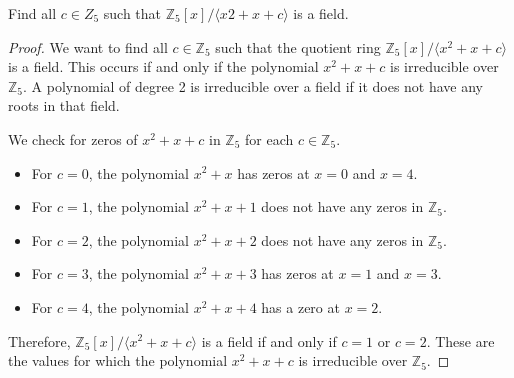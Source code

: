 \documentclass[12pt]{amsart}
\theoremstyle{definition}
\numberwithin{equation}{section}
\theoremstyle{plain}
\newcommand{\Z}{\mathbb{Z}}
\begin{document}
\vspace*{20pt}
\begin{exercise}{8} Find all $c \in Z_5$ such that $\Z_5[x]/\langle x2 + x + c\rangle$ is a field.
\begin{proof}
We want to find all \( c \in \mathbb{Z}_5 \) such that the quotient ring \( \mathbb{Z}_5[x]/\langle x^2 + x + c \rangle \) is a field. This occurs if and only if the polynomial \( x^2 + x + c \) is irreducible over \( \mathbb{Z}_5 \). A polynomial of degree 2 is irreducible over a field if it does not have any roots in that field.

We check for zeros of \( x^2 + x + c \) in \( \mathbb{Z}_5 \) for each \( c \in \mathbb{Z}_5 \). 

\begin{itemize}
    \item For \( c = 0 \), the polynomial \( x^2 + x \) has zeros at \( x = 0 \) and \( x = 4 \).
    \item For \( c = 1 \), the polynomial \( x^2 + x + 1 \) does not have any zeros in \( \mathbb{Z}_5 \).
    \item For \( c = 2 \), the polynomial \( x^2 + x + 2 \) does not have any zeros in \( \mathbb{Z}_5 \).
    \item For \( c = 3 \), the polynomial \( x^2 + x + 3 \) has zeros at \( x = 1 \) and \( x = 3 \).
    \item For \( c = 4 \), the polynomial \( x^2 + x + 4 \) has a zero at \( x = 2 \).
\end{itemize}

Therefore, \( \mathbb{Z}_5[x]/\langle x^2 + x + c \rangle \) is a field if and only if \( c = 1 \) or \( c = 2 \). These are the values for which the polynomial \( x^2 + x + c \) is irreducible over \( \mathbb{Z}_5 \).
\end{proof}
\end{exercise}
\vspace*{20pt}
\end{document}
